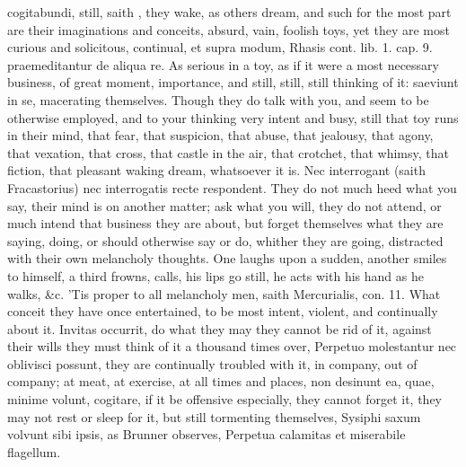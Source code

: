 {cogitabundi, still, saith \Avicenna{}, they wake, as others dream, and
such for the most part are their imaginations and conceits,
absurd, vain, foolish toys, yet they are most curious and
solicitous, continual, et supra modum, Rhasis cont. lib. 1. cap. 9.
praemeditantur de aliqua re. As serious in a toy, as if it were a most
necessary business, of great moment, importance, and still, still,
still thinking of it: saeviunt in se, macerating themselves. Though
they do talk with you, and seem to be otherwise employed, and to your
thinking very intent and busy, still that toy runs in their mind, that
fear, that suspicion, that abuse, that jealousy, that agony, that
vexation, that cross, that castle in the air, that crotchet, that
whimsy, that fiction, that pleasant waking dream, whatsoever it is. Nec
interrogant (saith Fracastorius) nec interrogatis recte
respondent. They do not much heed what you say, their mind is on
another matter; ask what you will, they do not attend, or much intend
that business they are about, but forget themselves what they are
saying, doing, or should otherwise say or do, whither they are going,
distracted with their own melancholy thoughts. One laughs upon a
sudden, another smiles to himself, a third frowns, calls, his lips go
still, he acts with his hand as he walks, \&c. 'Tis proper to all
melancholy men, saith Mercurialis, con. 11. What conceit they
have once entertained, to be most intent, violent, and continually
about it. Invitas occurrit, do what they may they cannot be rid of it,
against their wills they must think of it a thousand times over,
Perpetuo molestantur nec oblivisci possunt, they are continually
troubled with it, in company, out of company; at meat, at exercise, at
all times and places, non desinunt ea, quae, minime volunt,
cogitare, if it be offensive especially, they cannot forget it, they
may not rest or sleep for it, but still tormenting themselves, Sysiphi
saxum volvunt sibi ipsis, as Brunner observes, Perpetua calamitas
et miserabile flagellum.

}
